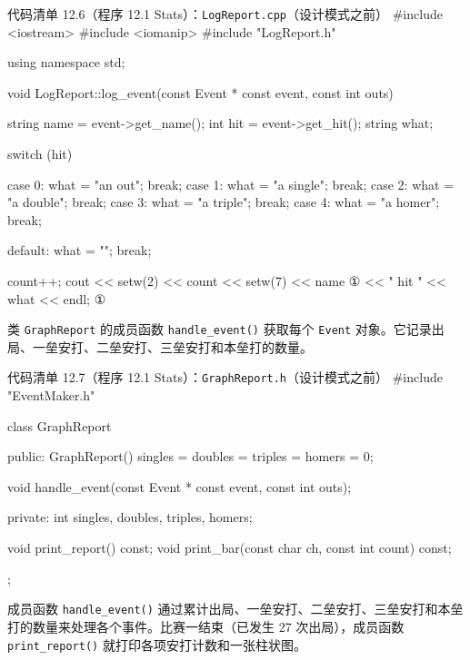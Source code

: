\begin{codeboxt}{代码清单 12.6（程序 12.1 Stats）：\texttt{Log\allowbreak{}Report.\allowbreak{}cpp}（设计模式之前）}
#include <iostream>
#include <iomanip>
#include "LogReport.h"

using namespace std;

void LogReport::log_event(const Event * const event, const int outs)
{
    string  name = event->get_name();
    int     hit  = event->get_hit();
    string  what;

    switch (hit)
    {
        case 0: what = "an out";   break;
        case 1: what = "a single"; break;
        case 2: what = "a double"; break;
        case 3: what = "a triple"; break;
        case 4: what = "a homer";  break;

        default: what = ""; break;
    }

    count++;
    cout << setw(2) << count << setw(7) << name  ①
         << " hit " << what << endl;             ①
}
\end{codeboxt}
\par

类 \texttt{Graph\allowbreak{}Report} 的成员函数 \texttt{handle\_\allowbreak{}event(\allowbreak{})\allowbreak{}} 获取每个 \texttt{Event} 对象。它记录出局、一垒安打、二垒安打、三垒安打和本垒打的数量。

\begin{codeboxt}{代码清单 12.7（程序 12.1 Stats）：\texttt{Graph\allowbreak{}Report.\allowbreak{}h}（设计模式之前）}
#include "EventMaker.h"

class GraphReport
{
public:
    GraphReport()
    {
        singles = doubles = triples = homers = 0;
    }

    void handle_event(const Event * const event, const int outs);

private:
    int singles, doubles, triples, homers;

    void print_report() const;
    void print_bar(const char ch, const int count) const;
};
\end{codeboxt}

成员函数 \texttt{handle\_\allowbreak{}event(\allowbreak{})\allowbreak{}} 通过累计出局、一垒安打、二垒安打、三垒安打和本垒打的数量来处理各个事件。比赛一结束（已发生 27 次出局），成员函数 \texttt{print\_\allowbreak{}report(\allowbreak{})\allowbreak{}} 就打印各项安打计数和一张柱状图。

